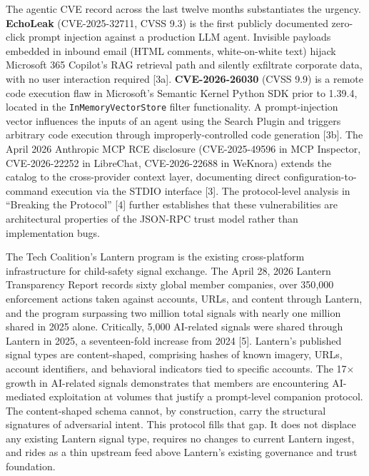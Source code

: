 \documentclass[11pt]{article}
\begin{document}
The agentic CVE record across the last twelve months substantiates the urgency. \textbf{EchoLeak} (CVE-2025-32711, CVSS 9.3) is the first publicly documented zero-click prompt injection against a production LLM agent. Invisible payloads embedded in inbound email (HTML comments, white-on-white text) hijack Microsoft 365 Copilot's RAG retrieval path and silently exfiltrate corporate data, with no user interaction required [3a]. \textbf{CVE-2026-26030} (CVSS 9.9) is a remote code execution flaw in Microsoft's Semantic Kernel Python SDK prior to 1.39.4, located in the \texttt{InMemoryVectorStore} filter functionality. A prompt-injection vector influences the inputs of an agent using the Search Plugin and triggers arbitrary code execution through improperly-controlled code generation [3b]. The April 2026 Anthropic MCP RCE disclosure (CVE-2025-49596 in MCP Inspector, CVE-2026-22252 in LibreChat, CVE-2026-22688 in WeKnora) extends the catalog to the cross-provider context layer, documenting direct configuration-to-command execution via the STDIO interface [3]. The protocol-level analysis in ``Breaking the Protocol'' [4] further establishes that these vulnerabilities are architectural properties of the JSON-RPC trust model rather than implementation bugs.

The Tech Coalition's Lantern program is the existing cross-platform infrastructure for child-safety signal exchange. The April 28, 2026 Lantern Transparency Report records sixty global member companies, over 350{,}000 enforcement actions taken against accounts, URLs, and content through Lantern, and the program surpassing two million total signals with nearly one million shared in 2025 alone. Critically, 5{,}000 AI-related signals were shared through Lantern in 2025, a seventeen-fold increase from 2024 [5]. Lantern's published signal types are content-shaped, comprising hashes of known imagery, URLs, account identifiers, and behavioral indicators tied to specific accounts. The 17$\times$ growth in AI-related signals demonstrates that members are encountering AI-mediated exploitation at volumes that justify a prompt-level companion protocol. The content-shaped schema cannot, by construction, carry the structural signatures of adversarial intent. This protocol fills that gap. It does not displace any existing Lantern signal type, requires no changes to current Lantern ingest, and rides as a thin upstream feed above Lantern's existing governance and trust foundation.
\end{document}
